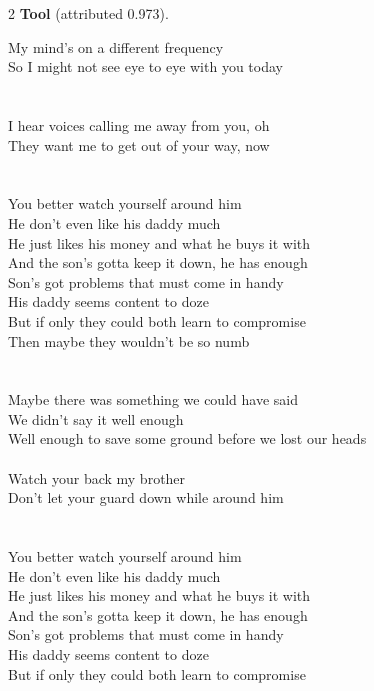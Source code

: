 \begin{multicols}{2}
\nopagebreak\noindent\textbf{Tool} (attributed 0.973).\par\nopagebreak\vspace{4pt}
{\footnotesize\itshape\raggedright
My mind's on a different frequency \\
So I might not see eye to eye with you today \\
\mbox{} \\
\mbox{} \\
I hear voices calling me away from you, oh \\
They want me to get out of your way, now \\
\mbox{} \\
\mbox{} \\
You better watch yourself around him \\
He don't even like his daddy much \\
He just likes his money and what he buys it with \\
And the son's gotta keep it down, he has enough \\
Son's got problems that must come in handy \\
His daddy seems content to doze \\
But if only they could both learn to compromise \\
Then maybe they wouldn't be so numb \\
\mbox{} \\
\mbox{} \\
Maybe there was something we could have said \\
We didn't say it well enough \\
Well enough to save some ground before we lost our heads \\
\mbox{} \\
Watch your back my brother \\
Don't let your guard down while around him \\
\mbox{} \\
\mbox{} \\
You better watch yourself around him \\
He don't even like his daddy much \\
He just likes his money and what he buys it with \\
And the son's gotta keep it down, he has enough \\
Son's got problems that must come in handy \\
His daddy seems content to doze \\
But if only they could both learn to compromise \\
}
\end{multicols}
